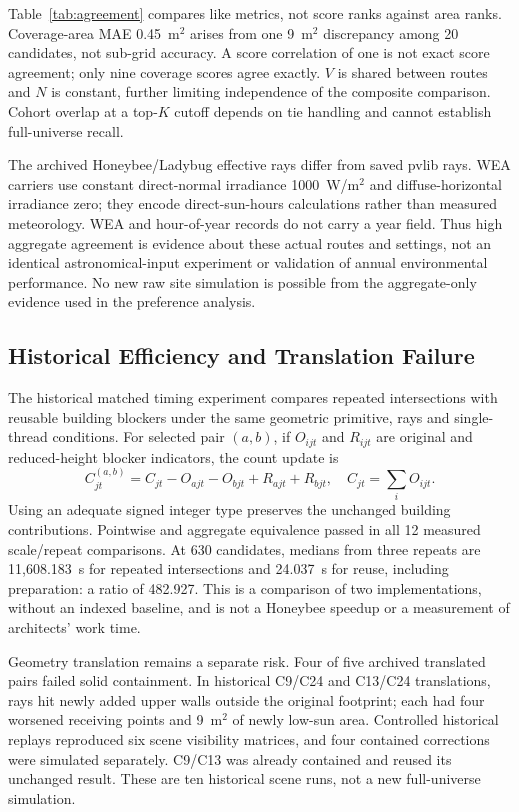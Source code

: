 \documentclass{llncs}
\begin{document}
Table~\ref{tab:agreement} compares like metrics, not score ranks against area ranks. Coverage-area MAE 0.45~m$^2$ arises from one 9~m$^2$ discrepancy among 20 candidates, not sub-grid accuracy. A score correlation of one is not exact score agreement; only nine coverage scores agree exactly. $V$ is shared between routes and $N$ is constant, further limiting independence of the composite comparison. Cohort overlap at a top-$K$ cutoff depends on tie handling and cannot establish full-universe recall.

The archived Honeybee/Ladybug effective rays differ from saved pvlib rays. WEA carriers use constant direct-normal irradiance 1000~W/m$^2$ and diffuse-horizontal irradiance zero; they encode direct-sun-hours calculations rather than measured meteorology. WEA and hour-of-year records do not carry a year field. Thus high aggregate agreement is evidence about these actual routes and settings, not an identical astronomical-input experiment or validation of annual environmental performance. No new raw site simulation is possible from the aggregate-only evidence used in the preference analysis.

\subsection{Historical Efficiency and Translation Failure}
The historical matched timing experiment compares repeated intersections with reusable building blockers under the same geometric primitive, rays and single-thread conditions. For selected pair $(a,b)$, if $O_{ijt}$ and $R_{ijt}$ are original and reduced-height blocker indicators, the count update is
\begin{equation}
 C_{jt}^{(a,b)}=C_{jt}-O_{ajt}-O_{bjt}+R_{ajt}+R_{bjt},\quad C_{jt}=\sum_i O_{ijt}.
\label{eq:blocker}
\end{equation}
Using an adequate signed integer type preserves the unchanged building contributions. Pointwise and aggregate equivalence passed in all 12 measured scale/repeat comparisons. At 630 candidates, medians from three repeats are 11,608.183~s for repeated intersections and 24.037~s for reuse, including preparation: a ratio of 482.927. This is a comparison of two implementations, without an indexed baseline, and is not a Honeybee speedup or a measurement of architects' work time.

Geometry translation remains a separate risk. Four of five archived translated pairs failed solid containment. In historical C9/C24 and C13/C24 translations, rays hit newly added upper walls outside the original footprint; each had four worsened receiving points and 9~m$^2$ of newly low-sun area. Controlled historical replays reproduced six scene visibility matrices, and four contained corrections were simulated separately. C9/C13 was already contained and reused its unchanged result. These are ten historical scene runs, not a new full-universe simulation.
\end{document}
